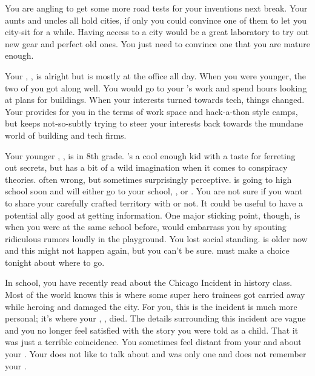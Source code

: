 \documentclass[char]{LRSguildcamp1}
\begin{document}
You are angling to get some more road tests for your inventions next break. Your aunts and uncles all hold cities, if only you could convince one of them to let you city-sit for a while. Having access to a city would be a great laboratory to try out new gear and perfect old ones. You just need to convince one that you are mature enough.

Your \cArchitect{\parent}, \cArchitect{}, is alright but is mostly at the office all day. When you were younger, the two of you got along well. You would go to your \cArchitect{\parent}'s work and spend hours looking at plans for buildings. When your interests turned towards tech, things changed. Your \cArchitect{\parent} provides for you in the terms of work space and hack-a-thon style camps, but keeps not-so-subtly trying to steer your interests back towards the mundane world  of building and tech firms. 

Your younger \cTween{\sibling}, \cTween{}, is in 8th grade. \cTween{}'s a cool enough kid with a taste for ferreting out secrets, but has a bit of a wild imagination when it comes to conspiracy theories. \cTween{\Theyare} often wrong, but sometimes \cTween{\are} surprisingly perceptive. \cTween{} is going to high school soon and will either go to your school, \pNormalSchool{}, or \pSuperSchool{}. You are not sure if you want to share your carefully crafted territory with \cTween{\them} or not. It could be useful to have a potential ally good at getting information. One major sticking point, though, is when you were at the same school before, \cTween{} would embarrass you by spouting ridiculous rumors loudly in the playground. You lost social standing. \cTween{} is older now and this might not happen again, but you can't be sure. \cTween{} must make a choice tonight about where to go.

In school, you have recently read about the Chicago Incident in history class. Most of the world knows this is where some super hero trainees got carried away while heroing and damaged the city. For you, this is the incident is much more personal; it's where your \cAS{\parent}, \cAS{\full}, died. The details surrounding this incident are vague and you no longer feel satisfied with the story you were told as a child. That it was just a terrible coincidence. You sometimes feel distant from your \cArchitect{\parent} and \cTween{} about your \cAS{\parent}. Your \cArchitect{\parent} does not like to talk about \cAS{} and \cTween{} was only one and does not remember your \cAS{\parent}. 
\end{document}
